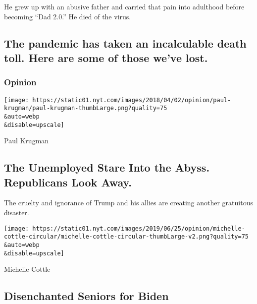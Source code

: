 He grew up with an abusive father and carried that pain into adulthood
before becoming ``Dad 2.0.'' He died of the virus.

\href{/interactive/2020/obituaries/people-died-coronavirus-obituaries.html}{}

\hypertarget{the-pandemic-has-taken-an-incalculable-death-toll-here-are-some-of-those-weve-lost}{%
\subsection{The pandemic has taken an incalculable death toll. Here are
some of those we've
lost.}\label{the-pandemic-has-taken-an-incalculable-death-toll-here-are-some-of-those-weve-lost}}

\href{https://www.nytimes.com/section/opinion?pagetype=Homepage\&action=click\&module=Opinion}{}

\hypertarget{opinion}{%
\subsubsection{Opinion}\label{opinion}}

\href{/2020/08/03/opinion/republicans-unemployed-coronavirus.html}{}

\texttt{[image: https://static01.nyt.com/images/2018/04/02/opinion/paul-krugman/paul-krugman-thumbLarge.png?quality=75\\\&auto=webp\\\&disable=upscale]}

Paul Krugman

\hypertarget{the-unemployed-stare-into-the-abyss-republicans-look-away}{%
\subsection{The Unemployed Stare Into the Abyss. Republicans Look
Away.}\label{the-unemployed-stare-into-the-abyss-republicans-look-away}}

The cruelty and ignorance of Trump and his allies are creating another
gratuitous disaster.

\href{/2020/08/03/opinion/senior-voters-biden-trump-2020.html}{}

\texttt{[image: https://static01.nyt.com/images/2019/06/25/opinion/michelle-cottle-circular/michelle-cottle-circular-thumbLarge-v2.png?quality=75\\\&auto=webp\\\&disable=upscale]}

Michelle Cottle

\hypertarget{disenchanted-seniors-for-biden}{%
\subsection{Disenchanted Seniors for
Biden}\label{disenchanted-seniors-for-biden}}

